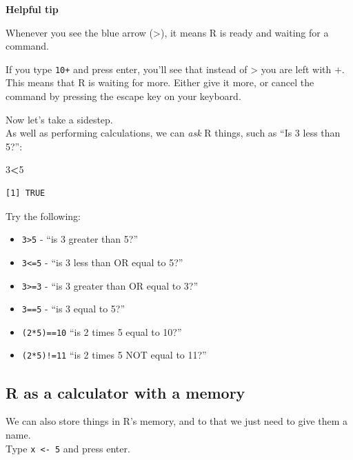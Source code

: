 \documentclass[]{book}
\newenvironment{Shaded}{\begin{snugshade}}{\end{snugshade}}
\newcommand{\DecValTok}[1]{\textcolor[rgb]{0.00,0.00,0.81}{#1}}
\newcommand{\OperatorTok}[1]{\textcolor[rgb]{0.81,0.36,0.00}{\textbf{#1}}}
\providecommand{\tightlist}{%
  \setlength{\itemsep}{0pt}\setlength{\parskip}{0pt}}
\begin{document}
\textbf{Helpful tip}

Whenever you see the blue arrow ({\textgreater{}}), it means R is ready and waiting for a command.

If you type \texttt{10+} and press enter, you'll see that instead of {\textgreater{}} you are left with {+}. This means that R is waiting for more. Either give it more, or cancel the command by pressing the escape key on your keyboard.

Now let's take a sidestep.\\
As well as performing calculations, we can \emph{ask} R things, such as ``Is 3 less than 5?'':

\begin{Shaded}
\begin{Highlighting}[]
\DecValTok{3}\OperatorTok{<}\DecValTok{5}
\end{Highlighting}
\end{Shaded}

\begin{verbatim}
[1] TRUE
\end{verbatim}

Try the following:

\begin{itemize}
\tightlist
\item
  \texttt{3\textgreater{}5} - ``is 3 greater than 5?''
\item
  \texttt{3\textless{}=5} - ``is 3 less than OR equal to 5?''
\item
  \texttt{3\textgreater{}=3} - ``is 3 greater than OR equal to 3?''
\item
  \texttt{3==5} - ``is 3 equal to 5?''
\item
  \texttt{(2*5)==10} ``is 2 times 5 equal to 10?''
\item
  \texttt{(2*5)!=11} ``is 2 times 5 NOT equal to 11?''
\end{itemize}

\hypertarget{r-as-a-calculator-with-a-memory}{%
\subsection*{R as a calculator with a memory}\label{r-as-a-calculator-with-a-memory}}

We can also store things in R's memory, and to that we just need to give them a name.\\
Type \texttt{x\ \textless{}-\ 5} and press enter.
\end{document}
